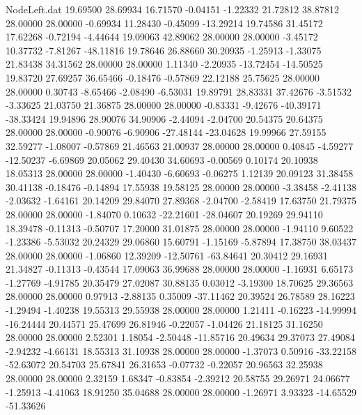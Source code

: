 \begin{filecontents}{NodeLeft.dat}
  19.69500   28.69934   16.71570    -0.04151   -1.22332   21.72812   38.87812   28.00000   28.00000   -0.69934   11.28430   -0.45099  -13.29214
  19.74586   31.45172   17.62268    -0.72194   -4.44644   19.09063   42.89062   28.00000   28.00000   -3.45172   10.37732   -7.81267  -48.11816
  19.78646   26.88660   30.20935    -1.25913   -1.33075   21.83438   34.31562   28.00000   28.00000    1.11340   -2.20935  -13.72454  -14.50525
  19.83720   27.69257   36.65466    -0.18476   -0.57869   22.12188   25.75625   28.00000   28.00000    0.30743   -8.65466   -2.08490   -6.53031
  19.89791   28.83331   37.42676    -3.51532   -3.33625   21.03750   21.36875   28.00000   28.00000   -0.83331   -9.42676  -40.39171  -38.33424
  19.94896   28.90076   34.90906    -2.44094   -2.04700   20.54375   20.64375   28.00000   28.00000   -0.90076   -6.90906  -27.48144  -23.04628
  19.99966   27.59155   32.59277    -1.08007   -0.57869   21.46563   21.00937   28.00000   28.00000    0.40845   -4.59277  -12.50237   -6.69869
  20.05062   29.40430   34.60693    -0.00569    0.10174   20.10938   18.05313   28.00000   28.00000   -1.40430   -6.60693   -0.06275    1.12139
  20.09123   31.38458   30.41138    -0.18476   -0.14894   17.55938   19.58125   28.00000   28.00000   -3.38458   -2.41138   -2.03632   -1.64161
  20.14209   29.84070   27.89368    -2.04700   -2.58419   17.63750   21.79375   28.00000   28.00000   -1.84070    0.10632  -22.21601  -28.04607
  20.19269   29.94110   18.39478    -0.11313   -0.50707   17.20000   31.01875   28.00000   28.00000   -1.94110    9.60522   -1.23386   -5.53032
  20.24329   29.06860   15.60791    -1.15169   -5.87894   17.38750   38.03437   28.00000   28.00000   -1.06860   12.39209  -12.50761  -63.84641
  20.30412   29.16931   21.34827    -0.11313   -0.43544   17.09063   36.99688   28.00000   28.00000   -1.16931    6.65173   -1.27769   -4.91785
  20.35479   27.02087   30.88135     0.03012   -3.19300   18.70625   29.36563   28.00000   28.00000    0.97913   -2.88135    0.35009  -37.11462
  20.39524   26.78589   28.16223    -1.29494   -1.40238   19.55313   29.55938   28.00000   28.00000    1.21411   -0.16223  -14.99994  -16.24444
  20.44571   25.47699   26.81946    -0.22057   -1.04426   21.18125   31.16250   28.00000   28.00000    2.52301    1.18054   -2.50448  -11.85716
  20.49634   29.37073   27.49084    -2.94232   -4.66131   18.55313   31.10938   28.00000   28.00000   -1.37073    0.50916  -33.22158  -52.63072
  20.54703   25.67841   26.31653    -0.07732   -0.22057   20.96563   32.25938   28.00000   28.00000    2.32159    1.68347   -0.83854   -2.39212
  20.58755   29.26971   24.06677    -1.25913   -4.41063   18.91250   35.04688   28.00000   28.00000   -1.26971    3.93323  -14.65529  -51.33626

\end{filecontents}

